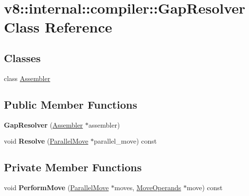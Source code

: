 \hypertarget{classv8_1_1internal_1_1compiler_1_1_gap_resolver}{}\section{v8\+:\+:internal\+:\+:compiler\+:\+:Gap\+Resolver Class Reference}
\label{classv8_1_1internal_1_1compiler_1_1_gap_resolver}
\subsection*{Classes}
\begin{DoxyCompactItemize}
\item 
class \hyperlink{classv8_1_1internal_1_1compiler_1_1_gap_resolver_1_1_assembler}{Assembler}
\end{DoxyCompactItemize}
\subsection*{Public Member Functions}
\begin{DoxyCompactItemize}
\item 
{\bfseries Gap\+Resolver} (\hyperlink{classv8_1_1internal_1_1compiler_1_1_gap_resolver_1_1_assembler}{Assembler} $\ast$assembler)\hypertarget{classv8_1_1internal_1_1compiler_1_1_gap_resolver_a7ff2dc278d86e6eb68c34551d4d90306}{}\label{classv8_1_1internal_1_1compiler_1_1_gap_resolver_a7ff2dc278d86e6eb68c34551d4d90306}

\item 
void {\bfseries Resolve} (\hyperlink{classv8_1_1internal_1_1compiler_1_1_parallel_move}{Parallel\+Move} $\ast$parallel\+\_\+move) const \hypertarget{classv8_1_1internal_1_1compiler_1_1_gap_resolver_acf1df453e1cb24a4bfdfbb16fba20dac}{}\label{classv8_1_1internal_1_1compiler_1_1_gap_resolver_acf1df453e1cb24a4bfdfbb16fba20dac}

\end{DoxyCompactItemize}
\subsection*{Private Member Functions}
\begin{DoxyCompactItemize}
\item 
void {\bfseries Perform\+Move} (\hyperlink{classv8_1_1internal_1_1compiler_1_1_parallel_move}{Parallel\+Move} $\ast$moves, \hyperlink{classv8_1_1internal_1_1compiler_1_1_move_operands}{Move\+Operands} $\ast$move) const \hypertarget{classv8_1_1internal_1_1compiler_1_1_gap_resolver_a43be0092f004cf1c9f8da492cfb377b5}{}\label{classv8_1_1internal_1_1compiler_1_1_gap_resolver_a43be0092f004cf1c9f8da492cfb377b5}

\end{DoxyCompactItemize}
